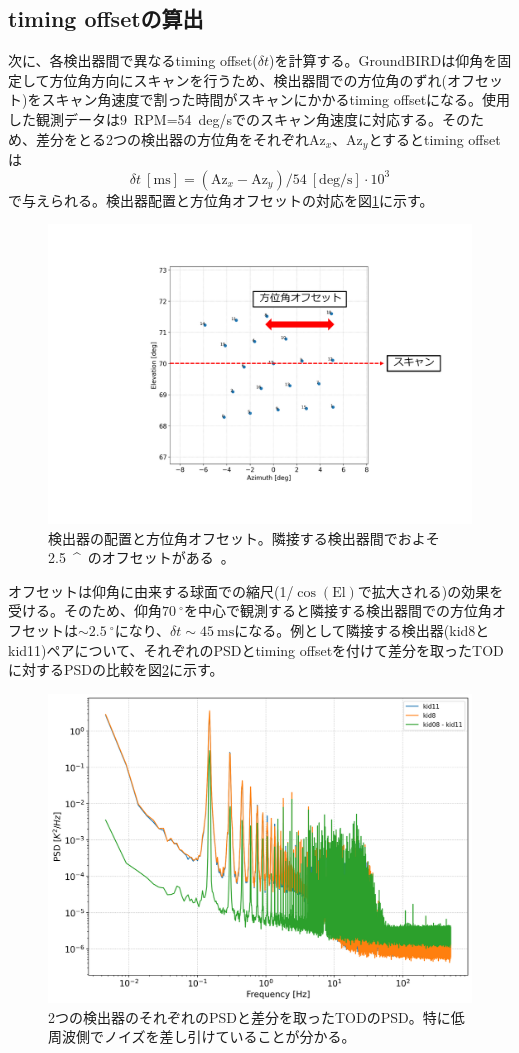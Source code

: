 \subsection{timing offsetの算出}
次に、各検出器間で異なるtiming offset($\delta t$)を計算する。GroundBIRDは仰角を固定して方位角方向にスキャンを行うため、検出器間での方位角のずれ(オフセット)をスキャン角速度で割った時間がスキャンにかかるtiming offsetになる。使用した観測データは\SI{9}{RPM}=\SI{54}{deg/s}でのスキャン角速度に対応する。そのため、差分をとる2つの検出器の方位角をそれぞれ$\mathrm{Az}_{x}$、$\mathrm{Az}_{y}$とするとtiming offsetは
\begin{equation}
  \delta t~[\mathrm{ms}] = (\mathrm{Az}_{x} - \mathrm{Az}_{y}) / \SI{54}{[\mathrm{deg/s}]}\cdot 10^{3}
\end{equation}
で与えられる。検出器配置と方位角オフセットの対応を図\ref{timing_offset}に示す。
\begin{figure}[htbp]
  \centering
  \includegraphics[width=0.75\columnwidth]{5_alignment/figs/timing_offset.pdf}
  \caption{検出器の配置と方位角オフセット。隣接する検出器間でおよそ\SI{2.5}{^{\circ}}のオフセットがある。}
  \label{timing_offset}
\end{figure}
オフセットは仰角に由来する球面での縮尺(1/$\cos(\mathrm{El})$で拡大される)の効果を受ける。そのため、仰角$\SI{70}{^\circ}$を中心で観測すると隣接する検出器間での方位角オフセットは$\sim\SI{2.5}{^\circ}$になり、$\delta t\sim\SI{45}{\mathrm{ms}}$になる。例として隣接する検出器(kid8とkid11)ペアについて、それぞれのPSDとtiming offsetを付けて差分を取ったTODに対するPSDの比較を図\ref{9011_psd_compare}に示す。
\begin{figure}[htbp]
  \centering
  \includegraphics[width=0.75\columnwidth]{5_alignment/figs/9011_08_11_psd.png}
  \caption{2つの検出器のそれぞれのPSDと差分を取ったTODのPSD。特に低周波側でノイズを差し引けていることが分かる。}
  \label{9011_psd_compare}
\end{figure}

